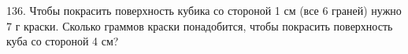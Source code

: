 136. Чтобы покрасить поверхность кубика со стороной 1 см (все 6 граней) нужно 7 г краски. Сколько граммов краски понадобится, чтобы покрасить поверхность куба со стороной 4 см?\\
